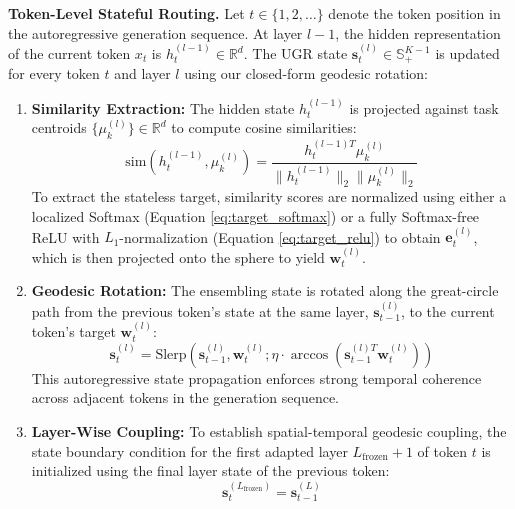 \documentclass{article}
\theoremstyle{plain}
\theoremstyle{definition}
\theoremstyle{remark}
\begin{document}
\textbf{Token-Level Stateful Routing.} Let $t \in \{1, 2, \dots\}$ denote the token position in the autoregressive generation sequence. At layer $l-1$, the hidden representation of the current token $x_t$ is $h_t^{(l-1)} \in \mathbb{R}^d$. The UGR state $\mathbf{s}_t^{(l)} \in \mathbb{S}^{K-1}_+$ is updated for every token $t$ and layer $l$ using our closed-form geodesic rotation:
\begin{enumerate}
    \item \textbf{Similarity Extraction:} The hidden state $h_t^{(l-1)}$ is projected against task centroids $\{\mu_k^{(l)}\} \in \mathbb{R}^d$ to compute cosine similarities:
    \begin{equation}
    \text{sim}(h_t^{(l-1)}, \mu_k^{(l)}) = \frac{h_t^{(l-1) T} \mu_k^{(l)}}{\|h_t^{(l-1)}\|_2 \|\mu_k^{(l)}\|_2}
    \end{equation}
    To extract the stateless target, similarity scores are normalized using either a localized Softmax (Equation \eqref{eq:target_softmax}) or a fully Softmax-free ReLU with $L_1$-normalization (Equation \eqref{eq:target_relu}) to obtain $\mathbf{e}_t^{(l)}$, which is then projected onto the sphere to yield $\mathbf{w}_t^{(l)}$.
    \item \textbf{Geodesic Rotation:} The ensembling state is rotated along the great-circle path from the previous token's state at the same layer, $\mathbf{s}_{t-1}^{(l)}$, to the current token's target $\mathbf{w}_t^{(l)}$:
    \begin{equation}
    \mathbf{s}_t^{(l)} = \text{Slerp}\left(\mathbf{s}_{t-1}^{(l)}, \mathbf{w}_t^{(l)}; \eta \cdot \arccos\left(\mathbf{s}_{t-1}^{(l) T} \mathbf{w}_t^{(l)}\right)\right)
    \end{equation}
    This autoregressive state propagation enforces strong temporal coherence across adjacent tokens in the generation sequence.
    \item \textbf{Layer-Wise Coupling:} To establish spatial-temporal geodesic coupling, the state boundary condition for the first adapted layer $L_{\text{frozen}}+1$ of token $t$ is initialized using the final layer state of the previous token:
    \begin{equation}
    \mathbf{s}_t^{(L_{\text{frozen}})} = \mathbf{s}_{t-1}^{(L)}
    \end{equation}
\end{enumerate}
\end{document}
